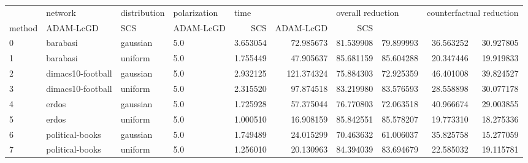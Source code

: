 \begin{tabular}{llllrrrrrr}
\toprule
{} &            network & distribution & polarization & \multicolumn{2}{l}{time} & \multicolumn{2}{l}{overall reduction} & \multicolumn{2}{l}{counterfactual reduction} \\
method & ADAM-LcGD &         SCS &         ADAM-LcGD &        SCS &                ADAM-LcGD &        SCS \\
\midrule
0 &           barabasi &     gaussian &          5.0 &  3.653054 &   72.985673 &         81.539908 &  79.899993 &                36.563252 &  30.927805 \\
1 &           barabasi &      uniform &          5.0 &  1.755449 &   47.905637 &         85.681159 &  85.604288 &                20.347446 &  19.919833 \\
2 &  dimacs10-football &     gaussian &          5.0 &  2.932125 &  121.374324 &         75.884303 &  72.925359 &                46.401008 &  39.824527 \\
3 &  dimacs10-football &      uniform &          5.0 &  2.315520 &   97.874518 &         83.219980 &  83.576593 &                28.558898 &  30.077178 \\
4 &              erdos &     gaussian &          5.0 &  1.725928 &   57.375044 &         76.770803 &  72.063518 &                40.966674 &  29.003855 \\
5 &              erdos &      uniform &          5.0 &  1.000510 &   16.908159 &         85.842551 &  85.578207 &                19.773310 &  18.275336 \\
6 &    political-books &     gaussian &          5.0 &  1.749489 &   24.015299 &         70.463632 &  61.006037 &                35.825758 &  15.277059 \\
7 &    political-books &      uniform &          5.0 &  1.256010 &   20.130963 &         84.394039 &  83.694679 &                22.585032 &  19.115781 \\
\bottomrule
\end{tabular}
